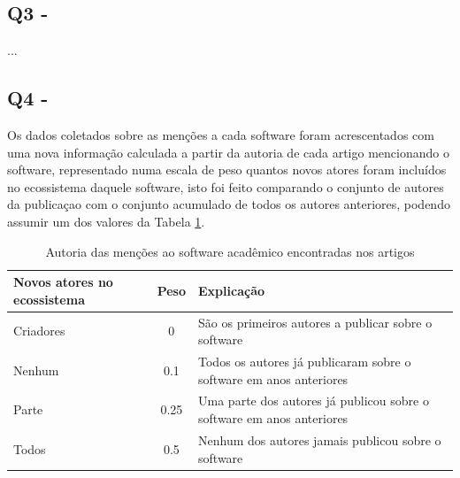 \subsection{Q3 - \QuestaoTres}

...


\subsection{Q4 - \QuestaoQuatro}

Os dados coletados sobre as menções a cada software foram acrescentados com uma
nova informação calculada a partir da autoria de cada artigo mencionando o
software, representado numa escala de peso quantos novos atores foram incluídos
no ecossistema daquele software, isto foi feito comparando o conjunto de autores
da publicaçao com o conjunto acumulado de todos os autores anteriores, 
podendo assumir um dos valores da Tabela \ref{coding-scheme-author}.


\begin{table}[h]
\caption{Autoria das menções ao software acadêmico encontradas nos artigos}
\centering
\begin{tabular}{ l c p{10cm} }
  \hline
  Novos atores no ecossistema & Peso & Explicação \\
  \hline
  Criadores & 0 & São os primeiros autores a publicar sobre o software \\
  Nenhum    & 0.1 & Todos os autores já publicaram sobre o software em anos anteriores \\
  Parte     & 0.25 & Uma parte dos autores já publicou sobre o software em anos anteriores \\
  Todos     & 0.5 & Nenhum dos autores jamais publicou sobre o software \\
  \hline
\end{tabular}
\label{coding-scheme-author}
\end{table}

